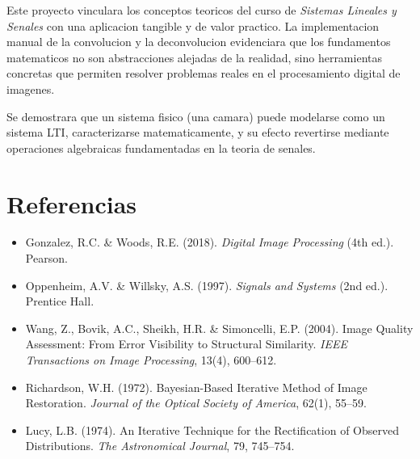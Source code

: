 \documentclass[11pt,a4paper]{article}
\begin{document}
Este proyecto vinculara los conceptos teoricos del curso de \textit{Sistemas Lineales y Senales} con una aplicacion tangible y de valor practico. La implementacion manual de la convolucion y la deconvolucion evidenciara que los fundamentos matematicos no son abstracciones alejadas de la realidad, sino herramientas concretas que permiten resolver problemas reales en el procesamiento digital de imagenes.

Se demostrara que un sistema fisico (una camara) puede modelarse como un sistema LTI, caracterizarse matematicamente, y su efecto revertirse mediante operaciones algebraicas fundamentadas en la teoria de senales.

\section*{Referencias}

\begin{itemize}[leftmargin=*, noitemsep]
    \item Gonzalez, R.C. \& Woods, R.E. (2018). \textit{Digital Image Processing} (4th ed.). Pearson.
    \item Oppenheim, A.V. \& Willsky, A.S. (1997). \textit{Signals and Systems} (2nd ed.). Prentice Hall.
    \item Wang, Z., Bovik, A.C., Sheikh, H.R. \& Simoncelli, E.P. (2004). Image Quality Assessment: From Error Visibility to Structural Similarity. \textit{IEEE Transactions on Image Processing}, 13(4), 600--612.
    \item Richardson, W.H. (1972). Bayesian-Based Iterative Method of Image Restoration. \textit{Journal of the Optical Society of America}, 62(1), 55--59.
    \item Lucy, L.B. (1974). An Iterative Technique for the Rectification of Observed Distributions. \textit{The Astronomical Journal}, 79, 745--754.
\end{itemize}
\end{document}

